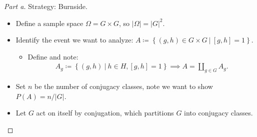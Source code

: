 \begin{solution}

\envlist

\begin{proof}[Part a]

Strategy: Burnside.

\begin{itemize}
\item
  Define a sample space \(\Omega = G \times G\), so
  \({\left\lvert {\Omega} \right\rvert} = {\left\lvert {G} \right\rvert}^2\).
\item
  Identify the event we want to analyze:
  \(A \coloneqq\left\{{(g,h) \in G\times G {~\mathrel{\Big|}~}[g,h] = 1}\right\}\).

  \begin{itemize}
  \tightlist
  \item
    Define and note:
    \begin{align*}
    A_g \coloneqq\left\{{(g, h) {~\mathrel{\Big|}~}h\in H, [g, h] = 1}\right\} \implies A = {\coprod}_{g\in G} A_g
    .\end{align*}
  \end{itemize}
\item
  Set \(n\) be the number of conjugacy classes, note we want to show
  \(P(A) = n / {\left\lvert {G} \right\rvert}\).
\item
  Let \(G\) act on itself by conjugation, which partitions \(G\) into
  conjugacy classes.


\end{itemize}
\end{proof}
\end{solution}
